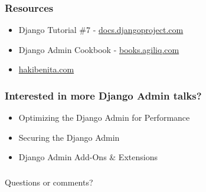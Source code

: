 \documentclass[aspectratio=169]{beamer}
\begin{document}
\begin{frame}
\begin{figure}[p]
  \centering
\end{figure}

\end{frame}




\begin{frame}
\frametitle{Resources}
  \begin{itemize}
    \item {\small Django Tutorial \#7 - \href{https://docs.djangoproject.com/en/2.2/intro/tutorial07/}{docs.djangoproject.com}}
    \item {\small Django Admin Cookbook - \href{https://books.agiliq.com/projects/django-admin-cookbook}{books.agiliq.com}}
    \item {\small \href{https://hakibenita.com/tag/django-admin}{hakibenita.com}}
  \end{itemize}
\end{frame}




\begin{frame}
\frametitle{Interested in more Django Admin talks?}
  \begin{itemize}
    \item {\small Optimizing the Django Admin for Performance}
    \item {\small Securing the Django Admin}
    \item {\small Django Admin Add-Ons \& Extensions}
  \end{itemize}
\end{frame}




\begin{frame}
\frametitle{}
  {\huge Questions or comments?}
\end{frame}
\end{document}
